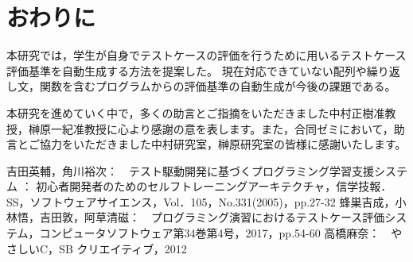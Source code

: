 \documentclass{tpu-sotu}
\begin{document}
\chapter{おわりに}
本研究では，学生が自身でテストケースの評価を行うために用いるテストケース評価基準を自動生成する方法を提案した。
現在対応できていない配列や繰り返し文，関数を含むプログラムからの評価基準の自動生成が今後の課題である。

\acknowledgements
本研究を進めていく中で，多くの助言とご指摘をいただきました中村正樹准教授，榊原一紀准教授に心より感謝の意を表します。また，合同ゼミにおいて，助言とご協力をいただきました中村研究室，榊原研究室の皆様に感謝いたします。
\begin{thebibliography}{2}
    吉田英輔，角川裕次：　テスト駆動開発に基づくプログラミング学習支援システム ： 初心者開発者のためのセルフトレーニングアーキテクチャ，信学技報．\\SS，ソフトウェアサイエンス，Vol．105，No.331(2005)，pp.27-32
    蜂巣吉成，小林悟，吉田敦，阿草清磁：　プログラミング演習におけるテストケース評価システム，コンピュータソフトウェア第34巻第4号，2017，pp.54-60
    高橋麻奈：　やさしいC，SB クリエイティブ，2012
\end{thebibliography}
\end{document}
